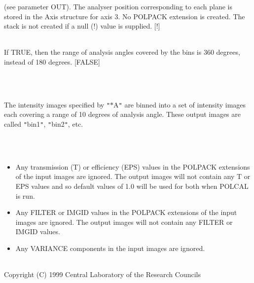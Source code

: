 \documentclass[twoside,11pt]{article}
\renewcommand{\_}{\texttt{\symbol{95}}}
\newlength{\sstexampleslength}
\newcommand{\sstexamples}[1]{
   \item[Examples:] \mbox{} \\
   \vspace{-3.5ex}
   \begin{description}
      #1
   \end{description}
}
\newcommand{\sstsubsection}[1]{ \item[{#1}] \mbox{} \\}
\newcommand{\sstexamplesubsection}[2]{\sloppy
\item[\parbox{\sstexampleslength}{\ssttt #1}] \mbox{} \vspace{1.0ex}
\\ #2 }
\newcommand{\sstnotes}[1]{\item[Notes:] \mbox{} \\[1.3ex] #1}
\newcommand{\sstdiytopic}[2]{\item[{\hspace{-0.35em}#1\hspace{-0.35em}:}]
\mbox{} \\[1.3ex] #2}
\newcommand{\sstitemlist}[1]{
  \mbox{} \\
  \vspace{-3.5ex}
  \begin{itemize}
     #1
  \end{itemize}
}
\newcommand{\sstitem}{\item}
\newcommand{\sstexamples}[1]{
      \item[Examples:] \\
      \begin{description}
         #1
      \end{description}
      \\
   }
\newcommand{\sstsubsection}[1]{\item[{#1}]}
\newcommand{\sstexamplesubsection}[2]{\item[{\ssttt #1}] #2}
\newcommand{\sstnotes}[1]{\item[Notes:] #1 }
\newcommand{\sstdiytopic}[2]{\item[{#1}] #2 }
\newcommand{\sstitemlist}[1]{
      \begin{itemize}
         #1
      \end{itemize}
      \\
   }
\newcommand{\sstitem}{\item}
\begin{document}
{{{         (see parameter OUT). The analyser position corresponding to each
         plane is stored in the Axis structure for axis 3. No POLPACK
         extension is created. The stack is not created if a null (!)
         value is supplied. [!]
      }
      \sstsubsection{
         TWOPI = \_LOGICAL (Read)
      }{
         If TRUE, then the range of analysis angles covered by the bins
         is 360 degrees, instead of 180 degrees. [FALSE]
      }
   }
   \sstexamples{
      \sstexamplesubsection{
         polstack {\tt "}$*$\_A{\tt "} {\tt "}bin$*${\tt "} 10
      }{
         The intensity images specified by {\tt "}$*$\_A{\tt "} are binned into a set
         of intensity images each covering a range of 10 degrees of
         analysis angle. These output images are called {\tt "}bin1{\tt "}, {\tt "}bin2{\tt "},
         etc.
      }
   }
   \sstnotes{
      \sstitemlist{

         \sstitem
         Any transmission (T) or efficiency (EPS) values in the POLPACK
         extensions of the input images are ignored. The output images will
         not contain any T or EPS values and so default values of 1.0 will
         be used for both when POLCAL is run.

         \sstitem
         Any FILTER or IMGID values in the POLPACK extensions of the
         input images are ignored. The output images will not contain any
         FILTER or IMGID values.

         \sstitem
         Any VARIANCE components in the input images are ignored.
      }
   }
   \sstdiytopic{
      Copyright
   }{
      Copyright (C) 1999 Central Laboratory of the Research Councils
   }
}
\end{document}
